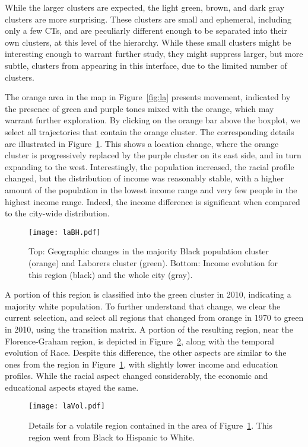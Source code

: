 While the larger clusters are expected, the light green, brown, and dark gray
clusters are more surprising. These clusters are small and ephemeral, including
only a few CTs, and are peculiarly different enough to be separated into their
own clusters, at this level of the hierarchy. While these small clusters might
be interesting enough to warrant further study, they might suppress larger, but
more subtle, clusters from appearing in this interface,  due to the limited
number of clusters.

The orange area in the map in Figure~\ref{fig:la} presents movement, indicated by
the presence of green and purple tones mixed with the orange, which may warrant
further exploration. By clicking on the orange bar above the boxplot, we select
all trajectories that contain the orange cluster. The corresponding details are
illustrated in Figure~\ref{fig:labh}. This shows a location change, where the
orange cluster is progressively replaced by the purple cluster on its east side,
and in turn expanding to the west. Interestingly, the population increased, the
racial profile changed, but the distribution of income was reasonably stable,
with a higher amount of the population in the lowest income range and very few
people in the highest income range. Indeed, the income  difference is
significant when compared to the city-wide distribution.

\begin{figure}
    \centering 
    \texttt{[image: laBH.pdf]}
    \caption{Top: Geographic changes in the majority Black population cluster
    (orange) and Laborers cluster (green). Bottom: Income evolution for this
    region (black) and the whole city (gray).\label{fig:labh}}
\end{figure}


A portion of this region is classified into the green cluster in 2010,
indicating a majority white population. To further understand that change, we
clear the current selection, and select all regions that changed from orange in
1970 to green in 2010, using the transition matrix. A portion of the resulting
region, near the Florence-Graham region, is depicted in Figure~\ref{fig:laVol},
along with the temporal evolution of Race. Despite this difference, the other
aspects are similar to the ones from the region in Figure~\ref{fig:labh}, with
slightly lower income and education profiles. While the racial aspect changed
considerably, the economic and educational aspects stayed the same.

\begin{figure}
    \centering 
    \texttt{[image: laVol.pdf]}
    \caption{Details for a volatile region contained in the area of
         Figure~\ref{fig:labh}. This region went from Black to Hispanic to
        White.\label{fig:laVol}}
\end{figure}



